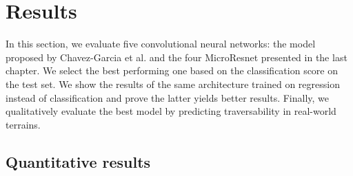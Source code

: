 \documentclass[../document.tex]{subfiles}
\begin{document}
\chapter{Results}
\label{chap: results}
In this section, we evaluate five convolutional neural networks: the model proposed by Chavez-Garcia et al. \cite{omar2018traversability} and the four MicroResnet presented in the last chapter. We  select the best performing one based on the classification score on the test set. We show the results of the same architecture trained on regression instead of classification and prove the latter yields better results. Finally, we qualitatively evaluate the best model by predicting traversability in real-world terrains. 




\section{Quantitative results}
\end{document}
